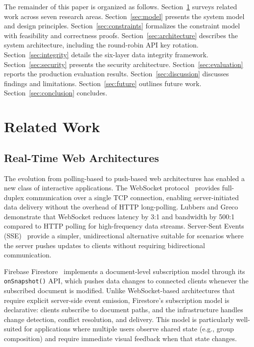 \documentclass[11pt,a4paper]{article}
\theoremstyle{plain}
\theoremstyle{definition}
\begin{document}
The remainder of this paper is organized as follows. Section~\ref{sec:related} surveys related work across seven research areas. Section~\ref{sec:model} presents the system model and design principles. Section~\ref{sec:constraints} formalizes the constraint model with feasibility and correctness proofs. Section~\ref{sec:architecture} describes the system architecture, including the round-robin API key rotation. Section~\ref{sec:integrity} details the six-layer data integrity framework. Section~\ref{sec:security} presents the security architecture. Section~\ref{sec:evaluation} reports the production evaluation results. Section~\ref{sec:discussion} discusses findings and limitations. Section~\ref{sec:future} outlines future work. Section~\ref{sec:conclusion} concludes.

\section{Related Work}
\label{sec:related}

\subsection{Real-Time Web Architectures}

The evolution from polling-based to push-based web architectures has enabled a new class of interactive applications. The WebSocket protocol~\cite{pimentel2012} provides full-duplex communication over a single TCP connection, enabling server-initiated data delivery without the overhead of HTTP long-polling. Lubbers and Greco~\cite{lubbers2010} demonstrate that WebSocket reduces latency by 3:1 and bandwidth by 500:1 compared to HTTP polling for high-frequency data streams. Server-Sent Events (SSE)~\cite{grigorik2013} provide a simpler, unidirectional alternative suitable for scenarios where the server pushes updates to clients without requiring bidirectional communication.

Firebase Firestore~\cite{firebase} implements a document-level subscription model through its \texttt{onSnapshot()} API, which pushes data changes to connected clients whenever the subscribed document is modified. Unlike WebSocket-based architectures that require explicit server-side event emission, Firestore's subscription model is declarative: clients subscribe to document paths, and the infrastructure handles change detection, conflict resolution, and delivery. This model is particularly well-suited for applications where multiple users observe shared state (e.g., group composition) and require immediate visual feedback when that state changes.
\end{document}
